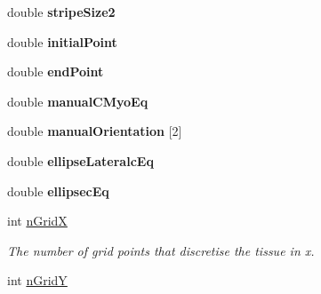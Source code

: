 \begin{DoxyCompactItemize}
\item 
\hypertarget{classMyosinFunction_a540d49e3dbb0b6b119eebfa3d3dcb4bb}{}double {\bfseries stripe\+Size2}\label{classMyosinFunction_a540d49e3dbb0b6b119eebfa3d3dcb4bb}

\item 
\hypertarget{classMyosinFunction_a71b4c116055c970cd05c4ecd9fbeca6a}{}double {\bfseries initial\+Point}\label{classMyosinFunction_a71b4c116055c970cd05c4ecd9fbeca6a}

\item 
\hypertarget{classMyosinFunction_a21f2a844af80cb09c37fbc9b20909c7f}{}double {\bfseries end\+Point}\label{classMyosinFunction_a21f2a844af80cb09c37fbc9b20909c7f}

\item 
\hypertarget{classMyosinFunction_acfa8ebd891b11162a806a8ebf9b6f39a}{}double {\bfseries manual\+C\+Myo\+Eq}\label{classMyosinFunction_acfa8ebd891b11162a806a8ebf9b6f39a}

\item 
\hypertarget{classMyosinFunction_a8e71a34d5be53e6eb7c1d3621fe72455}{}double {\bfseries manual\+Orientation} \mbox{[}2\mbox{]}\label{classMyosinFunction_a8e71a34d5be53e6eb7c1d3621fe72455}

\item 
\hypertarget{classMyosinFunction_aaa5119523000f8083bae6c03c104bf6c}{}double {\bfseries ellipse\+Lateralc\+Eq}\label{classMyosinFunction_aaa5119523000f8083bae6c03c104bf6c}

\item 
\hypertarget{classMyosinFunction_aa18b20963cc47522dba8fba78204edde}{}double {\bfseries ellipsec\+Eq}\label{classMyosinFunction_aa18b20963cc47522dba8fba78204edde}

\item 
\hypertarget{classMyosinFunction_a36ac0b5ce87011878a7f1954e270e5ae}{}int \hyperlink{classMyosinFunction_a36ac0b5ce87011878a7f1954e270e5ae}{n\+Grid\+X}\label{classMyosinFunction_a36ac0b5ce87011878a7f1954e270e5ae}

\begin{DoxyCompactList}\small\item\em The number of grid points that discretise the tissue in x. \end{DoxyCompactList}\item 
\hypertarget{classMyosinFunction_a1652a8a0d154b136434bee037e0262a4}{}int \hyperlink{classMyosinFunction_a1652a8a0d154b136434bee037e0262a4}{n\+Grid\+Y}\label{classMyosinFunction_a1652a8a0d154b136434bee037e0262a4}


\end{DoxyCompactItemize}
